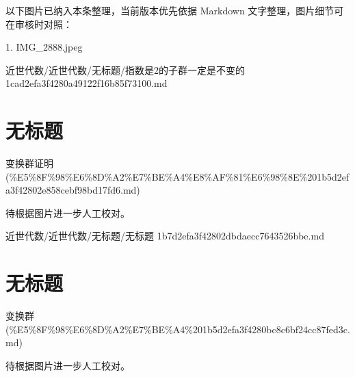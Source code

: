 \begin{note}[关联图片]
以下图片已纳入本条整理，当前版本优先依据 Markdown 文字整理，图片细节可在审核时对照：

1. IMG\_2888.jpeg\\

\end{note}

\begin{note}[来源路径]

近世代数/近世代数/无标题/指数是2的子群一定是不变的 1cad2efa3f4280a49122f16b85f73100.md

\end{note}

\section*{无标题}

\begin{note}[来源上级主题]

变换群证明 (\%E5\%8F\%98\%E6\%8D\%A2\%E7\%BE\%A4\%E8\%AF\%81\%E6\%98\%8E\%201b5d2efa3f42802e858cebf98bd17fd6.md)

\end{note}

\begin{note}[无标题]

待根据图片进一步人工校对。

\end{note}

\begin{note}[来源路径]

近世代数/近世代数/无标题/无标题 1b7d2efa3f42802dbdaecc7643526bbe.md

\end{note}

\section*{无标题}

\begin{note}[来源上级主题]

变换群 (\%E5\%8F\%98\%E6\%8D\%A2\%E7\%BE\%A4\%201b5d2efa3f4280bc8c6bf24cc87fed3c.md)

\end{note}

\begin{note}[无标题]

待根据图片进一步人工校对。

\end{note}

